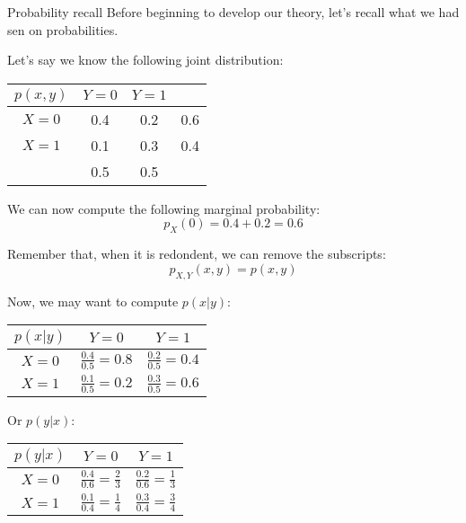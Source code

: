 \documentclass[a4paper]{article}
\begin{document}
\begin{parag}{Probability recall}
    Before beginning to develop our theory, let's recall what we had sen on probabilities.

    Let's say we know the following joint distribution:
    \begin{center}
    \begin{tabular}{c|cc||c}
        $p\left(x, y\right)$ & $Y = 0$ & $Y = 1$ & \\
        \hline
        $X = 0$ & 0.4 & 0.2 & 0.6 \\
        $X = 1$ & 0.1 & 0.3 & 0.4 \\
        \hhline{=|==#=}
                         & 0.5 & 0.5
    \end{tabular}
    \end{center}

    We can now compute the following marginal probability:
    \[p_X\left(0\right) = 0.4 + 0.2 = 0.6\]

    Remember that, when it is redondent, we can remove the subscripts:
    \[p_{X, Y}\left(x,y\right) = p\left(x, y\right)\]

    Now, we may want to compute $p\left(x|y\right)$:
    \begin{center}
    \begin{tabular}{c|cc}
        $p\left(x | y\right)$ & $Y = 0$ & $Y = 1$ \\
        \hline
        $X = 0$ & $\frac{0.4}{0.5} = 0.8$ & $\frac{0.2}{0.5} = 0.4$ \\
        $X = 1$ & $\frac{0.1}{0.5} = 0.2$ & $\frac{0.3}{0.5} = 0.6$
    \end{tabular}
    \end{center}

    Or $p\left(y|x\right)$:
    \begin{center}
    \begin{tabular}{c|cc}
        $p\left(y | x\right)$ & $Y = 0$ & $Y = 1$ \\
        \hline
        $X = 0$ & $\frac{0.4}{0.6} = \frac{2}{3}$ & $\frac{0.2}{0.6} = \frac{1}{3}$ \\
        $X = 1$ & $\frac{0.1}{0.4} = \frac{1}{4}$ & $\frac{0.3}{0.4} = \frac{3}{4}$
    \end{tabular}
    \end{center}

\end{parag}
\end{document}
